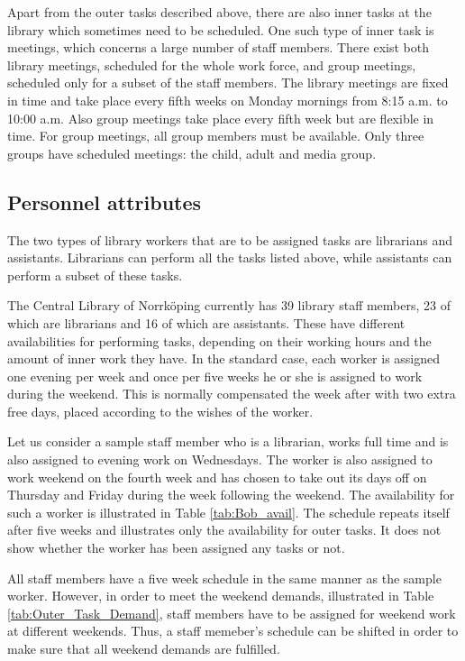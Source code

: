 Apart from the outer tasks described above, there are also inner tasks at the library which sometimes need to be scheduled. One such type of inner task is meetings, which concerns a large number of staff members. There exist both library meetings, scheduled for the whole work force, and group meetings, scheduled only for a subset of the staff members. The library meetings are fixed in time and take place every fifth weeks on Monday mornings from 8:15 a.m. to 10:00 a.m. Also group meetings take place every fifth week but are flexible in time. For group meetings, all group members must be available. Only three groups have scheduled meetings: the child, adult and media group.

\subsection{Personnel attributes}

The two types of library workers that are to be assigned tasks are librarians and assistants. Librarians can perform all the tasks listed above, while assistants can perform a subset of these tasks.

The Central Library of Norrköping currently has 39 library staff members, 23 of which are librarians and 16 of which are assistants. These have different availabilities for performing tasks, depending on their working hours and the amount of inner work they have. In the standard case, each worker is assigned one evening per week and once per five weeks he or she is assigned to work during the weekend. This is normally compensated the week after with two extra free days, placed according to the wishes of the worker.

Let us consider a sample staff member who is a librarian, works full time and is also assigned to evening work on Wednesdays. The worker is also assigned to work weekend on the fourth week and has chosen to take out its days off on Thursday and Friday during the week following the weekend. The availability for such a worker is illustrated in Table \ref{tab:Bob_avail}. The schedule repeats itself after five weeks and illustrates only the availability for outer tasks. It does not show whether the worker has been assigned any tasks or not.

All staff members have a five week schedule in the same manner as the sample worker. However, in order to meet the weekend demands, illustrated in Table \ref{tab:Outer_Task_Demand}, staff members have to be assigned for weekend work at different weekends. Thus, a staff memeber's schedule can be shifted in order to make sure that all weekend demands are fulfilled.

